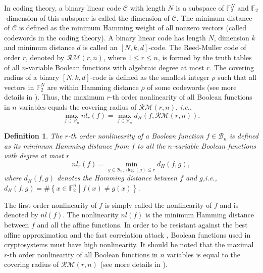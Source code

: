 \documentclass{article}
\newcommand{\F}{\mathbb{F}}
\newcommand{\0}{\textbf{0}}
\newcommand{\1}{\textbf{1}}
\theoremstyle{plain}
\newtheorem{definition}{Definition}
\begin{document}
    In coding theory, a binary linear code $\mathcal{C}$ with length $N$ is a subspace of $\F_2^N$ and $\F_2$-dimension of this subspace is called the dimension of $\mathcal{C}$.
    The minimum distance of $\mathcal{C}$ is defined as the minimum Hamming weight of all nonzero vectors (called codewords in the coding theory).
    A binary linear code has length $N$, dimension $k$ and minimum distance $d$ is called an $\left[ N,k,d \right]$-code.
    The Reed-Muller code of order $r$, denoted by $\mathcal{RM}(r,n)$, where $1\le r\le n$, is formed by the truth tables of all $n$-variable Boolean functions with algebraic degree at most $r$.  The covering radius of a binary $\left[ N,k,d \right]$-code is defined as the smallest integer $\rho$ such that all
    vectors in $\F_2^N$ are within Hamming distance $\rho$  of some codewords (see more details in \cite{MS1977}).
    Thus, the maximum $r$-th order nonlinearity of all Boolean functions in $n$ variables equals the covering radius of $\mathcal{RM}(r,n)$, \emph{i.e.},
    \[\max_{f\in \mathcal{B}_n}nl_r(f)=\max_{f\in\mathcal{B}_n}d_H(f,\mathcal{RM}(r,n)).\]

    \begin{definition}
        The $r$-th order nonlinearity of a Boolean function $f\in\mathcal{B}_n$ is defined as its minimum Hamming distance from $f$ to all the $n$-variable Boolean functions with degree at most $r$
        \[nl_r(f)=\min_{g\in\mathcal{B}_n,\deg(g)\le r} d_H(f,g),\]
        where $d_H(f,g)$ denotes the Hamming distance between $f$ and $g$,\emph{i.e.}, $d_H(f,g)=\#\left\{ x\in\F_2^n\middle|f(x)\ne g(x) \right\}$.
    \end{definition}
    The first-order nonlinearity of $f$ is simply called the nonlinearity of $f$ and is denoted by $nl(f)$.
    The nonlinearity $nl(f)$ is the minimum Hamming distance between $f$ and all the affine functions.
    In order to be resistant against the best affine approximation \cite{DingXS1991book} and the fast correlation attack \cite{MS1988fast_correlation_attack}, Boolean functions used in cryptosystems must have high nonlinearity.
    It should be noted that the maximal $r$-th order nonlinearity of all Boolean functions in $n$ variables is equal to the covering radius of $\mathcal{RM}(r, n)$ (see more details in \cite{CohenHLL1997RMcodecover}).
\end{document}
